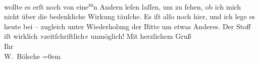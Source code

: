 \begin{ledgroupsized}[t]{13cm}
               wollte es erſt noch von eine\substVorne{}\textsuperscript{m}\substDazwischen{}n\substHinten{} Andern leſen laſſen, um  zu ſehen, ob ich
               mich nicht über die bedenkliche Wirkung täuſche. Es iſt alſo noch hier, und ich lege
               es heute bei – zugleich unter Wiederholung der Bitte um etwas Anderes. Der Stoff iſt wirklich
               »zeitſchriftlich« unmöglich!\pend
           \pstart
           Mit herzlichem Gruß{\\[\baselineskip]}Ihr{\\[\baselineskip]}\spacefill\mbox{W. Bölsche}\pend
           \leftskip=0em{}
         
         \endnumbering{}\end{ledgroupsized}  \newcommand{\dateiname}{L00106}\newcommand{\titel}{Wilhelm Bölsche an Arthur Schnitzler, [24. 7. 1892]}\newcommand{\editorInnen}{Martin Anton Müller und Gerd-Hermann Susen}
      